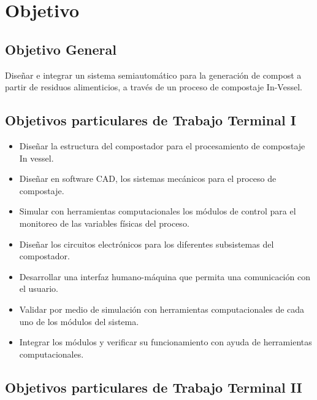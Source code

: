 \section{Objetivo}

\subsection*{Objetivo General}

Diseñar e integrar un sistema semiautomático para la generación de compost a partir de residuos alimenticios, a través de un proceso de compostaje In-Vessel. \\


\subsection*{Objetivos particulares de Trabajo Terminal I}
\begin{itemize}
    \item Diseñar la estructura del compostador para el procesamiento de compostaje In vessel.
    \item Diseñar en software CAD, los sistemas mecánicos para el proceso de compostaje.
    \item Simular con herramientas computacionales los módulos de control para el monitoreo de las variables físicas del proceso.
    \item Diseñar los circuitos electrónicos para los diferentes subsistemas del compostador.
    \item Desarrollar una interfaz humano-máquina que permita una comunicación con el usuario.
    \item Validar por medio de simulación con herramientas computacionales de cada uno de los módulos del sistema. 
    \item Integrar los módulos y verificar su funcionamiento con ayuda de herramientas computacionales.

\end{itemize}

\subsection*{Objetivos particulares de Trabajo Terminal II}

